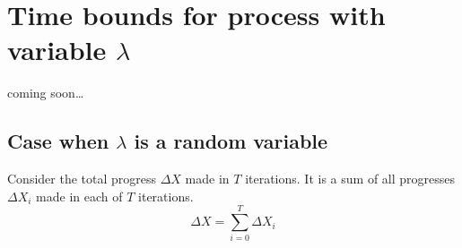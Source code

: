 \documentclass[12pt, a4paper]{article}
\theoremstyle{remark}
\theoremstyle{definition}
\newcommand{\cm}{coming soon\dots}
\begin{document}














\section{Time bounds for process with variable $\lambda$}
\cm
\subsection{Case when $\lambda$ is a random variable}
Consider the total progress $\Delta X$ made in $T$ iterations. It is a sum of all progresses $\Delta X_i$ made in each of $T$ iterations.
\[
    \Delta X = \sum_{i = 0}^{T} \Delta X_i
\]
\end{document}
